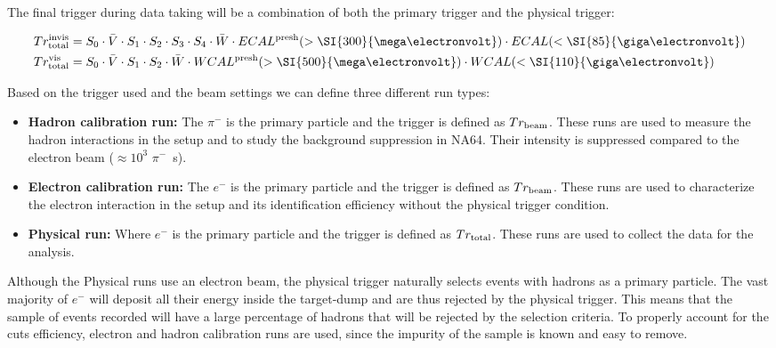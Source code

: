 The final trigger during data taking will be a combination of both the primary trigger and the physical trigger:

\begin{equation}
\label{eq:trigger-total}
\begin{split}
& Tr^{\rm{invis}}_{\rm{total}} = S_0 \cdot \bar{V} \cdot S_1 \cdot S_2 \cdot S_3 \cdot S_4 \cdot \bar{W} \cdot ECAL^{\rm{presh}}(> \SI{300}{\mega\electronvolt}) \cdot ECAL(<\SI{85}{\giga\electronvolt})\\
& Tr^{\rm{vis}}_{\rm{total}} = S_0 \cdot \bar{V} \cdot S_1 \cdot S_2\cdot \bar{W} \cdot WCAL^{\rm{presh}}(>\SI{500}{\mega\electronvolt}) \cdot WCAL(<\SI{110}{\giga\electronvolt})
\end{split}
\end{equation}

Based on the trigger used and the beam settings we can define three different run types:

\begin{itemize}
\item \textbf{Hadron calibration run:} The $\pi^-$ is the primary particle and the trigger is defined as $Tr_{\rm{beam}}$. These runs are used to measure the hadron interactions in the setup and to study the background suppression in NA64. Their intensity is suppressed compared to the electron beam ($\approx 10^{3}$ $\pi^-$\si{\per\second}).
\item \textbf{Electron calibration run:} The $e^-$ is the primary particle and the trigger is defined as $Tr_{\rm{beam}}$. These runs are used to characterize the electron interaction in the setup and its identification efficiency without the physical trigger condition. 

\item \textbf{Physical run:} Where $e^-$ is the primary particle and the trigger is defined as $Tr_{\rm{total}}$. These runs are used to collect the data for the analysis. 
\end{itemize}

Although the Physical runs use an electron beam, the physical trigger naturally selects events with hadrons as a primary particle. The vast majority of $e^-$ will deposit all their energy inside the target-dump and are thus rejected by the physical trigger. This means that the sample of events recorded will have a large percentage of hadrons that will be rejected by the selection criteria. To properly account for the cuts efficiency, electron and hadron calibration runs are used, since the impurity of the sample is known and easy to remove.

